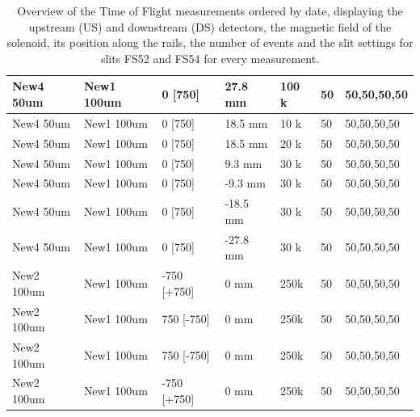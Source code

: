 \begin{refsection}
\begin{table}
\begin{tabular}{|l|l|l|l|l|l|l|}
            New4 50um   & New1 100um  & 0 {[}750{]}      & 27.8 mm  & 100 k  & 50            & 50,50,50,50       \\ \hline
            New4 50um   & New1 100um  & 0 {[}750{]}      & 18.5 mm  & 10 k   & 50            & 50,50,50,50       \\ \hline
            New4 50um   & New1 100um  & 0 {[}750{]}      & 18.5 mm  & 20 k   & 50            & 50,50,50,50       \\ \hline
            New4 50um   & New1 100um  & 0 {[}750{]}      & 9.3 mm   & 30 k   & 50            & 50,50,50,50       \\ \hline
            New4 50um   & New1 100um  & 0 {[}750{]}      & -9.3 mm  & 30 k   & 50            & 50,50,50,50       \\ \hline
            New4 50um   & New1 100um  & 0 {[}750{]}      & -18.5 mm & 30 k   & 50            & 50,50,50,50       \\ \hline
            New4 50um   & New1 100um  & 0 {[}750{]}      & -27.8 mm & 30 k   & 50            & 50,50,50,50       \\ \hline
            New2 100um  & New1 100um  & -750 {[}+750{]}  & 0 mm     & 250k   & 50            & 50,50,50,50       \\ \hline
            New2 100um  & New1 100um  & 750 {[}-750{]}   & 0 mm     & 250k   & 50            & 50,50,50,50       \\ \hline
            New2 100um  & New1 100um  & 750 {[}-750{]}   & 0 mm     & 250k   & 50            & 50,50,50,50       \\ \hline
            New2 100um  & New1 100um  & -750 {[}+750{]}  & 0 mm     & 250k   & 50            & 50,50,50,50       \\ \hline
            \end{tabular}
            \caption{Overview of the Time of Flight measurements ordered by date, displaying the upstream (US) and downstream (DS) detectors, the magnetic field of the solenoid, its position along the rails, the number of events and the slit settings for slits FS52 and FS54 for every measurement.}
        \label{tab:ToFMeasurementsOverview}
        \end{table}

\printbibliography[
    heading = bibliographychapter,
    title=Bibliography on muEDM entrance detector
]

\end{refsection}


